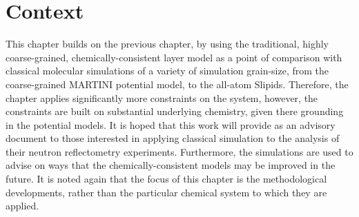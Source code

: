 \section*{Context}
This chapter builds on the previous chapter, by using the traditional, highly coarse-grained, chemically-consistent layer model as a point of comparison with classical molecular simulations of a variety of simulation grain-size, from the coarse-grained MARTINI potential model, to the all-atom Slipids.
Therefore, the chapter applies significantly more constraints on the system, however, the constraints are built on substantial underlying chemistry, given there grounding in the potential models.
It is hoped that this work will provide as an advisory document to those interested in applying classical simulation to the analysis of their neutron reflectometry experiments.
Furthermore, the simulations are used to advise on ways that the chemically-consistent models may be improved in the future.
It is noted again that the focus of this chapter is the methodological developments, rather than the particular chemical system to which they are applied.
